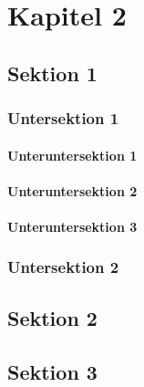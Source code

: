 \chapter{Kapitel 2}
\blindtext

\section{Sektion 1}
\blindtext

\subsection{Untersektion 1}
\blindtext

\subsubsection{Unteruntersektion 1}
\blindtext

\subsubsection{Unteruntersektion 2}
\blindtext

\subsubsection{Unteruntersektion 3}
\blindtext

\subsection{Untersektion 2}
\blindtext

\section{Sektion 2}
\blindtext

\section{Sektion 3}
\blindtext
